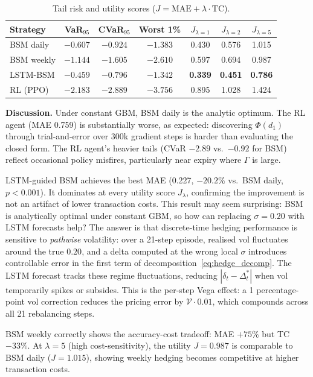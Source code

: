 \documentclass[12pt,a4paper]{article}
\begin{document}
\begin{table}[H]
  \centering
  \caption{Tail risk and utility scores ($J = \mathrm{MAE} + \lambda\cdot\mathrm{TC}$).}
  \label{tab:p1_tail}
  \begin{tabular}{lcccccc}
    \toprule
    Strategy & VaR$_{95}$ & CVaR$_{95}$ & Worst 1\% &
    $J_{\lambda=1}$ & $J_{\lambda=2}$ & $J_{\lambda=5}$ \\
    \midrule
    BSM daily       & $-0.607$ & $-0.924$ & $-1.383$ & 0.430 & 0.576 & 1.015 \\
    BSM weekly      & $-1.144$ & $-1.605$ & $-2.610$ & 0.597 & 0.694 & 0.987 \\
    LSTM-BSM        & $-0.459$ & $-0.796$ & $-1.342$ & \textbf{0.339} & \textbf{0.451} & \textbf{0.786} \\
    RL (PPO)        & $-2.183$ & $-2.889$ & $-3.756$ & 0.895 & 1.028 & 1.424 \\
    \bottomrule
  \end{tabular}
\end{table}

\textbf{Discussion.}  Under constant GBM, BSM daily is the analytic optimum.
The RL agent (MAE 0.759) is substantially worse, as expected: discovering
$\Phi(d_1)$ through trial-and-error over 300k gradient steps is harder than
evaluating the closed form.  The RL agent's heavier tails (CVaR $-2.89$
vs.\ $-0.92$ for BSM) reflect occasional policy misfires, particularly
near expiry where $\Gamma$ is large.

LSTM-guided BSM achieves the best MAE (0.227, $-20.2\%$ vs.\ BSM daily,
$p<0.001$).  It dominates at every utility score $J_\lambda$, confirming the
improvement is not an artifact of lower transaction costs.
This result may seem surprising: BSM is analytically optimal under constant
GBM, so how can replacing $\sigma=0.20$ with LSTM forecasts help?  The answer
is that discrete-time hedging performance is sensitive to \emph{pathwise}
volatility: over a 21-step episode, realised vol fluctuates around the true
$0.20$, and a delta computed at the wrong local $\sigma$ introduces controllable
error in the first term of decomposition~\eqref{eq:hedge_decomp}.  The LSTM
forecast tracks these regime fluctuations, reducing $|\delta_t - \Delta^*_t|$
when vol temporarily spikes or subsides.  This is the per-step Vega effect:
a 1 percentage-point vol correction reduces the pricing error by
$\mathcal{V}\cdot 0.01$, which compounds across all 21 rebalancing steps.

BSM weekly correctly shows the accuracy-cost tradeoff: MAE $+75\%$ but TC
$-33\%$.  At $\lambda=5$ (high cost-sensitivity), the utility $J=0.987$ is
comparable to BSM daily ($J=1.015$), showing weekly hedging becomes competitive
at higher transaction costs.
\end{document}

